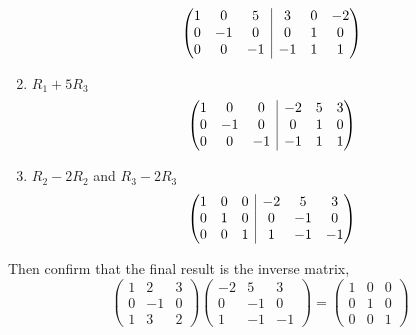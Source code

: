 \documentclass[diffeq.tex]{subfiles}
\begin{document}
\begin{example}
\begin{enumerate}
\begin{equation}
                \left(\begin{array}{@{}ccc|ccc@{}}
                    1 & 0 & 5 & 3 & 0 & -2 \\
                    0 & -1 & 0 & 0 & 1 & 0 \\
                    0 & 0 & -1 & -1 & 1 & 1
                    \end{array}\right)
            \end{equation}
            \item $R_{1} + 5R_{3}$
            \begin{equation}
                \left(\begin{array}{@{}ccc|ccc@{}}
                    1 & 0 & 0 & -2 & 5 & 3 \\
                    0 & -1 & 0 & 0 & 1 & 0 \\
                    0 & 0 & -1 & -1 & 1 & 1
                    \end{array}\right)
            \end{equation}
            \item $R_{2} - 2R_{2}$ and $R_{3} - 2R_{3}$
            \begin{equation}
                \left(\begin{array}{@{}ccc|ccc@{}}
                    1 & 0 & 0 & -2 & 5 & 3 \\
                    0 & 1 & 0 & 0 & -1 & 0 \\
                    0 & 0 & 1 & 1 & -1 & -1
                    \end{array}\right)
            \end{equation}
        \end{enumerate}
        Then confirm that the final result is the inverse matrix,
        \begin{equation}
            \begin{pmatrix}
                1 & 2 & 3\\
                0 & -1 & 0\\
                1 & 3 & 2
            \end{pmatrix}
            \begin{pmatrix}
                -2 & 5 & 3 \\
                0 & -1 & 0 \\
                1 & -1 & -1
            \end{pmatrix} = \begin{pmatrix}
                1 & 0 & 0 \\
                0 & 1 & 0 \\
                0 & 0 & 1
            \end{pmatrix}
        \end{equation}
    \end{example}
\end{document}
